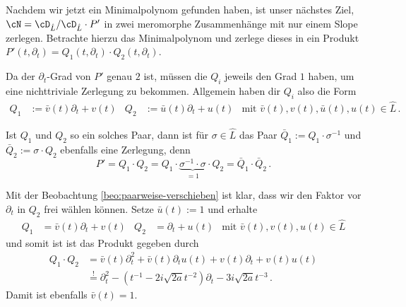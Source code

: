 Nachdem wir jetzt ein Minimalpolynom gefunden haben, ist unser nächstes Ziel,
$\cN=\cD_{\hat L}/\cD_{\hat L}\cdot P'$ in zwei meromorphe Zusammenhänge mit
nur einem Slope zerlegen.  Betrachte hierzu das Minimalpolynom und zerlege
dieses in ein Produkt $P'(t,\partial_t)=Q_1(t,\partial_t)\cdot
Q_2(t,\partial_t)$.

Da der $\partial_t$-Grad von $P'$ genau $2$ ist, müssen die $Q_i$
jeweils den Grad $1$ haben, um eine nichttriviale Zerlegung zu bekommen.
Allgemein haben dir $Q_i$ also die Form
\begin{align*}
Q_1&:=\bar v(t) \partial_t + v(t) & Q_2&:=\bar u(t)\partial_t + u(t)
& \mbox{mit } \bar v(t), v(t), \bar u(t), u(t)\in \hat L \,.
\end{align*}
\begin{beo} \label{beo:paarweise-verschieben}
Ist $Q_1$ und $Q_2$ so ein solches Paar, dann ist für $\sigma\in \hat L$ das
Paar $\bar Q_1:=Q_1\cdot \sigma^{-1}$ und $\bar Q_2:=\sigma\cdot Q_2$ ebenfalls
eine Zerlegung, denn
\[
P'=Q_1\cdot Q_2= Q_1\cdot
\underset{=1}{\underbrace{
  \sigma^{-1} \cdot \sigma
}}
\cdot Q_2 =\bar Q_1 \cdot \bar Q_2 \,.
\]
\end{beo}
Mit der Beobachtung \ref{beo:paarweise-verschieben} ist klar, dass wir den
Faktor vor $\partial_t$ in $Q_2$ frei wählen können. Setze $\bar u(t):=1$ und
erhalte
\begin{align*}
Q_1&=\bar v(t) \partial_t + v(t) & Q_2&=\partial_t + u(t)
& \mbox{mit } \bar v(t), v(t), u(t)\in \hat L
\end{align*}
und somit ist ist das Produkt gegeben durch
\begin{equation} \label{eq:schritt100}
  \begin{aligned}
Q_1\cdot Q_2&=\bar v(t) \partial_t^2 + \bar v(t)\partial_t u(t) +
  v(t)\partial_t + v(t)u(t)
\\&\overset{!}{=} \partial_t^2 - (t^{-1} - 2i\sqrt{2a}t^{-2})\partial_t
  - 3 i\sqrt{2a}t^{-3} \,.
  \end{aligned}
\end{equation}
Damit ist ebenfalls $\bar v(t)=1$.

